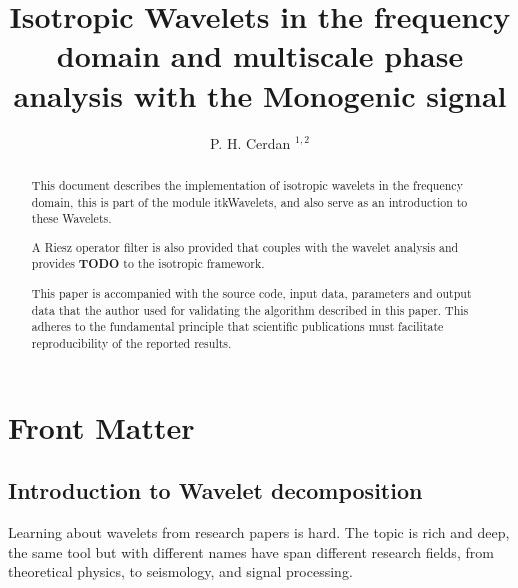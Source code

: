 \documentclass{InsightArticle}
\title{Isotropic Wavelets in the frequency domain and multiscale phase analysis with the Monogenic signal}
\author{P. H. Cerdan $^{1,2}$}
\theoremstyle{definition}
\newcommand{\IJhandlerIDnumber}{3558}
\begin{document}
%
%
\IJhandlefooter{\IJhandlerIDnumber}


\ifpdf
\else
\fi


\maketitle


\ifhtml
\chapter*{Front Matter\label{front}}
\fi

\begin{abstract}
\noindent
This document describes the implementation of isotropic wavelets in the frequency domain, this is part of the module itkWavelets,
and also serve as an introduction to these Wavelets.

A Riesz operator filter is also provided that couples with the wavelet analysis and provides \textbf{TODO} to the isotropic framework.

This paper is accompanied with the source code, input data, parameters and
output data that the author used for validating the algorithm described in
this paper. This adheres to the fundamental principle that scientific
publications must facilitate reproducibility of the reported results.

\end{abstract}

\IJhandlenote{\IJhandlerIDnumber}

\tableofcontents

\section{Introduction to Wavelet decomposition}
\label{sec:Intro}
Learning about wavelets from research papers is hard. The topic is rich and deep, the same tool but with different names have span different research fields, from theoretical physics, to seismology, and signal processing.
\end{document}
